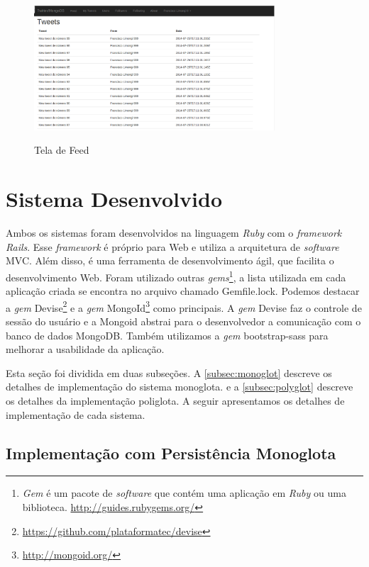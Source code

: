 \begin{figure}[H]
    \centering
    \caption{Tela de Feed}
    \includegraphics[width=0.8\textwidth]{./04-figuras/feed.png}
    \label{fig:feed}
\end{figure}


\section{Sistema Desenvolvido}
\label{sec:applications}

Ambos os sistemas foram desenvolvidos na linguagem \textit{Ruby} com o \textit{framework Rails}. Esse \textit{framework} é próprio para Web e utiliza a arquitetura de \textit{software} \ac{MVC}. Além disso, é uma ferramenta de desenvolvimento ágil, que facilita o desenvolvimento Web.
Foram utilizado outras \textit{gems}\footnote{\textit{Gem} é um pacote de \textit{software} que contém uma aplicação em \textit{Ruby} ou uma biblioteca. \url{http://guides.rubygems.org/}}, a lista utilizada em cada aplicação criada se encontra no arquivo chamado Gemfile.lock. Podemos destacar a \textit{gem} Devise\footnote{\url{https://github.com/plataformatec/devise}} e a \textit{gem} MongoId\footnote{\url{http://mongoid.org/}} como principais. A \textit{gem} Devise faz o controle de sessão do usuário e a Mongoid abstrai para o desenvolvedor a comunicação com o banco de dados MongoDB. Também utilizamos a \textit{gem} bootstrap-sass para melhorar a usabilidade da aplicação.

Esta seção foi dividida em duas subseções. A \autoref{subsec:monoglot} descreve os detalhes de implementação do sistema monoglota. e a \autoref{subsec:polyglot}  descreve os detalhes da implementação poliglota. A seguir apresentamos os detalhes de implementação de cada sistema.

\subsection{Implementação com Persistência Monoglota}
\label{subsec:monoglot}

